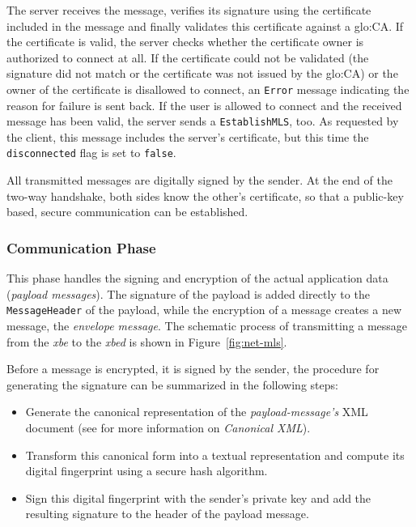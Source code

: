 The  server  receives  the  message,  verifies  its  signature  using  the
certificate included in the message and finally validates this certificate
against a  \gls{glo:CA}. If  the certificate is  valid, the  server checks
whether the  certificate owner  is authorized to  connect at all.   If the
certificate could not be validated (\ie the signature did not match or the
certificate  was not  issued  by the  \gls{glo:CA})  or the  owner of  the
certificate is disallowed to connect, an \texttt{Error} message indicating
the reason for failure is sent back. If the user is allowed to connect and
the   received   message   has    been   valid,   the   server   sends   a
\texttt{EstablishMLS},  too.  As  requested  by the  client, this  message
includes the server's certificate, but this time the \texttt{disconnected}
flag is set to \texttt{false}.

All transmitted messages are digitally signed by the sender. At the end of
the two-way handshake, both sides  know the other's certificate, so that a
public-key based, secure communication can be established.

\subsubsection{Communication Phase}

This phase  handles the signing  and encryption of the  actual application
data  (\emph{payload messages}).  The  signature of  the payload  is added
directly  to   the  \texttt{MessageHeader}  of  the   payload,  while  the
encryption  of  a  message  creates  a  new  message,  the  \emph{envelope
  message}.   The schematic  process of  transmitting a  message  from the
\emph{xbe} to the \emph{xbed} is shown in Figure~\ref{fig:net-mls}.
 
Before a message  is encrypted, it is signed by  the sender, the procedure
for generating the signature can be summarized in the following steps:

\begin{itemize}
\item     Generate     the     canonical     representation     of     the
  \emph{payload-message's} XML document (see \cite{canonical-xml} for more
  information on \emph{Canonical XML}).
\item  Transform this  canonical form  into a  textual  representation and
  compute its digital fingerprint using a secure hash algorithm.
\item Sign this digital fingerprint  with the sender's private key and add
  the resulting signature to the header of the payload message.
\end{itemize}

